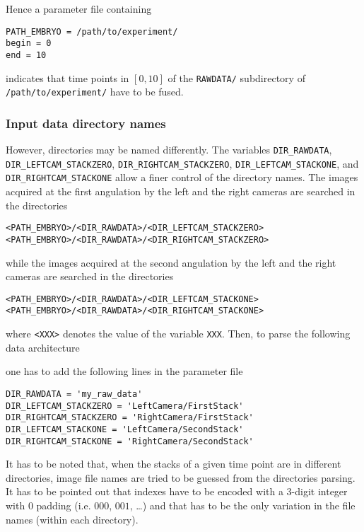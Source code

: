 Hence a parameter file containing
\begin{verbatim}
PATH_EMBRYO = /path/to/experiment/
begin = 0
end = 10
\end{verbatim}
indicates that time points in $[0,10]$ of the \texttt{RAWDATA/}
subdirectory of  \texttt{/path/to/experiment/} have to be fused.

\subsubsection{Input data directory names}

However, directories may be named differently. The variables
\texttt{DIR\_RAWDATA}, \texttt{DIR\_LEFTCAM\_STACKZERO},
\texttt{DIR\_RIGHTCAM\_STACKZERO}, \texttt{DIR\_LEFTCAM\_STACKONE},
and \texttt{DIR\_RIGHTCAM\_STACKONE} allow a finer control of the
directory names. The images acquired at the first angulation by the
left and the right cameras are searched in the directories
\begin{verbatim}
<PATH_EMBRYO>/<DIR_RAWDATA>/<DIR_LEFTCAM_STACKZERO>
<PATH_EMBRYO>/<DIR_RAWDATA>/<DIR_RIGHTCAM_STACKZERO>
\end{verbatim}
while the images acquired at the second angulation by the
left and the right cameras are searched in the directories
\begin{verbatim}
<PATH_EMBRYO>/<DIR_RAWDATA>/<DIR_LEFTCAM_STACKONE>
<PATH_EMBRYO>/<DIR_RAWDATA>/<DIR_RIGHTCAM_STACKONE>
\end{verbatim}
where \texttt{<XXX>} denotes the value of the variable \texttt{XXX}.
Then, to parse the following data architecture

\mbox{}
\mbox{}

one has to add the following lines in the parameter file
\begin{verbatim}
DIR_RAWDATA = 'my_raw_data'
DIR_LEFTCAM_STACKZERO = 'LeftCamera/FirstStack'
DIR_RIGHTCAM_STACKZERO = 'RightCamera/FirstStack'
DIR_LEFTCAM_STACKONE = 'LeftCamera/SecondStack'
DIR_RIGHTCAM_STACKONE = 'RightCamera/SecondStack'
\end{verbatim}

It has to be noted that, when the stacks of a given time point are in
different directories, image file names are tried to be guessed from
the directories parsing. It has to be pointed out that indexes have to
be encoded with a 3-digit integer with 0 padding (i.e. $000$, $001$,
\ldots) and that has to be the only variation in the file names
(within each directory).

